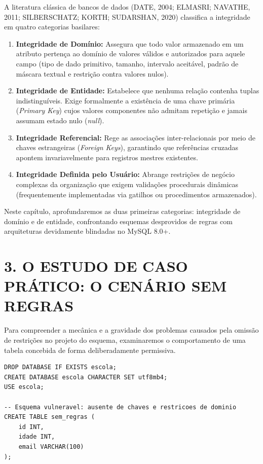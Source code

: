 A literatura clássica de bancos de dados (DATE, 2004; ELMASRI; NAVATHE, 2011; SILBERSCHATZ; KORTH; SUDARSHAN, 2020) classifica a integridade em quatro categorias basilares:
\begin{enumerate}
    \item \textbf{Integridade de Domínio:} Assegura que todo valor armazenado em um atributo pertença ao domínio de valores válidos e autorizados para aquele campo (tipo de dado primitivo, tamanho, intervalo aceitável, padrão de máscara textual e restrição contra valores nulos).
    \item \textbf{Integridade de Entidade:} Estabelece que nenhuma relação contenha tuplas indistinguíveis. Exige formalmente a existência de uma chave primária (\textit{Primary Key}) cujos valores componentes não admitam repetição e jamais assumam estado nulo (\textit{null}).
    \item \textbf{Integridade Referencial:} Rege as associações inter-relacionais por meio de chaves estrangeiras (\textit{Foreign Keys}), garantindo que referências cruzadas apontem invariavelmente para registros mestres existentes.
    \item \textbf{Integridade Definida pelo Usuário:} Abrange restrições de negócio complexas da organização que exigem validações procedurais dinâmicas (frequentemente implementadas via gatilhos ou procedimentos armazenados).
\end{enumerate}

Neste capítulo, aprofundaremos as duas primeiras categorias: integridade de domínio e de entidade, confrontando esquemas desprovidos de regras com arquiteturas devidamente blindadas no MySQL 8.0+.

\newpage

\section*{3. O ESTUDO DE CASO PRÁTICO: O CENÁRIO SEM REGRAS}

Para compreender a mecânica e a gravidade dos problemas causados pela omissão de restrições no projeto do esquema, examinaremos o comportamento de uma tabela concebida de forma deliberadamente permissiva.

\begin{lstlisting}
DROP DATABASE IF EXISTS escola;
CREATE DATABASE escola CHARACTER SET utf8mb4;
USE escola;

-- Esquema vulneravel: ausente de chaves e restricoes de dominio
CREATE TABLE sem_regras (
    id INT,
    idade INT,
    email VARCHAR(100)
);
\end{lstlisting}

